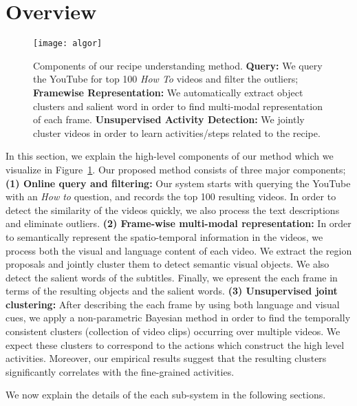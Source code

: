 \newpage
\section{Overview}
\label{sec:overview}
\begin{figure}[h]
  \texttt{[image: algor]}
  \caption{Components of our recipe understanding method. \textbf{Query:} We query the YouTube for top 100 \emph{How To} videos and filter the outliers; \textbf{Framewise Representation:} We automatically extract object clusters and salient word in order to find multi-modal representation of each frame. \textbf{Unsupervised Activity Detection:} We jointly cluster videos in order to learn activities/steps related to the recipe.}
\label{fig:overview}
\end{figure}

In this section, we explain the high-level components of our method which we visualize in Figure~\ref{fig:overview}. Our proposed method consists of three major components; \textbf{(1) Online query and filtering:} Our system starts with querying the YouTube with an \emph{How to} question, and records the top 100 resulting videos. In order to detect the similarity of the videos quickly, we also process the text descriptions and eliminate outliers. \textbf{(2) Frame-wise multi-modal representation:} In order to semantically represent the spatio-temporal information in the videos, we process both the visual and language content of each video. We extract the region proposals and jointly cluster them to detect semantic visual objects. We also detect the salient words of the subtitles. Finally, we epresent the each frame in terms of the resulting objects and the salient words. \textbf{(3) Unsupervised joint clustering:} After describing the each frame by using both language and visual cues, we apply a non-parametric Bayesian method in order to find the temporally consistent clusters (collection of video clips) occurring over multiple videos. We expect these clusters to correspond to the actions which construct the high level activities. Moreover, our empirical results suggest that the resulting clusters significantly correlates with the fine-grained activities.

We now explain the details of the each sub-system in the following sections.
